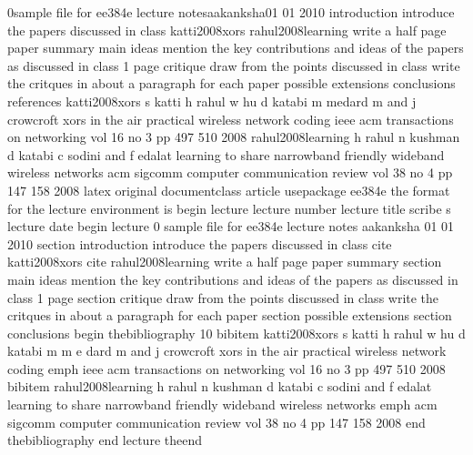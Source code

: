 0sample file for ee384e lecture notesaakanksha01 01 2010 introduction introduce the papers discussed in class katti2008xors rahul2008learning write a half page paper summary main ideas mention the key contributions and ideas of the papers as discussed in class 1 page critique draw from the points discussed in class write the critques in about a paragraph for each paper possible extensions conclusions references katti2008xors s katti h rahul w hu d katabi m medard m and j crowcroft xors in the air practical wireless network coding ieee acm transactions on networking vol 16 no 3 pp 497 510 2008 rahul2008learning h rahul n kushman d katabi c sodini and f edalat learning to share narrowband friendly wideband wireless networks acm sigcomm computer communication review vol 38 no 4 pp 147 158 2008 latex original documentclass article usepackage ee384e the format for the lecture environment is begin lecture lecture number lecture title scribe s lecture date begin lecture 0 sample file for ee384e lecture notes aakanksha 01 01 2010 section introduction introduce the papers discussed in class cite katti2008xors cite rahul2008learning write a half page paper summary section main ideas mention the key contributions and ideas of the papers as discussed in class 1 page section critique draw from the points discussed in class write the critques in about a paragraph for each paper section possible extensions section conclusions begin thebibliography 10 bibitem katti2008xors s katti h rahul w hu d katabi m m e dard m and j crowcroft xors in the air practical wireless network coding emph ieee acm transactions on networking vol 16 no 3 pp 497 510 2008 bibitem rahul2008learning h rahul n kushman d katabi c sodini and f edalat learning to share narrowband friendly wideband wireless networks emph acm sigcomm computer communication review vol 38 no 4 pp 147 158 2008 end thebibliography end lecture theend
